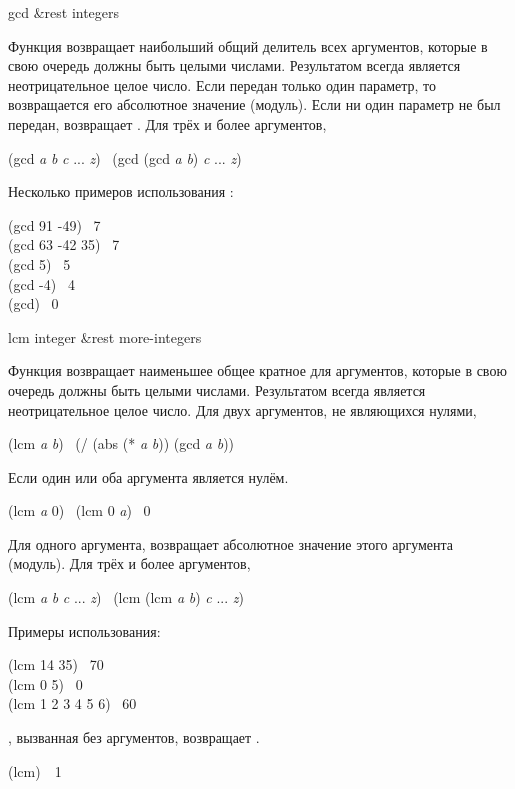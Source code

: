 \begin{defun}[Функция]
gcd &rest integers

Функция возвращает наибольший общий делитель всех аргументов, которые в свою
очередь должны быть целыми числами. Результатом  всегда является
неотрицательное целое число.
Если передан только один параметр, то возвращается его абсолютное значение
(модуль).
Если ни один параметр не был передан,  возвращает .
Для трёх и более аргументов,
\begin{lisp}
(gcd \emph{a} \emph{b} \emph{c} ... \emph{z}) \EQ\ (gcd (gcd \emph{a} \emph{b}) \emph{c} ... \emph{z})
\end{lisp}

Несколько примеров использования :
\begin{lisp}
(gcd 91 -49) \EV\ 7 \\
(gcd 63 -42 35) \EV\ 7 \\
(gcd 5) \EV\ 5 \\
(gcd -4) \EV\ 4 \\
(gcd) \EV\ 0
\end{lisp}
\end{defun}

\begin{defun}[Функция]
lcm integer &rest more-integers

Функция возвращает наименьшее общее кратное для аргументов, которые в свою
очередь должны быть целыми числами.
Результатом  всегда является неотрицательное целое число.
Для двух аргументов, не являющихся нулями,
\begin{lisp}
(lcm \emph{a} \emph{b}) \EQ\ (/ (abs (* \emph{a} \emph{b})) (gcd \emph{a} \emph{b}))
\end{lisp}
Если один или оба аргумента является нулём.
\begin{lisp}
(lcm \emph{a} 0) \EQ\ (lcm 0 \emph{a}) \EQ\ 0
\end{lisp}

Для одного аргумента,  возвращает абсолютное значение этого аргумента
(модуль). 
Для трёх и более аргументов,
\begin{lisp}
(lcm \emph{a} \emph{b} \emph{c} ... \emph{z}) \EQ\ (lcm (lcm \emph{a} \emph{b}) \emph{c} ... \emph{z})
\end{lisp}

Примеры использования:
\begin{lisp}
(lcm 14 35) \EV\ 70 \\
(lcm 0 5) \EV\ 0 \\
(lcm 1 2 3 4 5 6) \EV\ 60
\end{lisp}


, вызванная без аргументов, возвращает .
\begin{lisp}
(lcm)~\EV~1
\end{lisp}
\end{defun}

